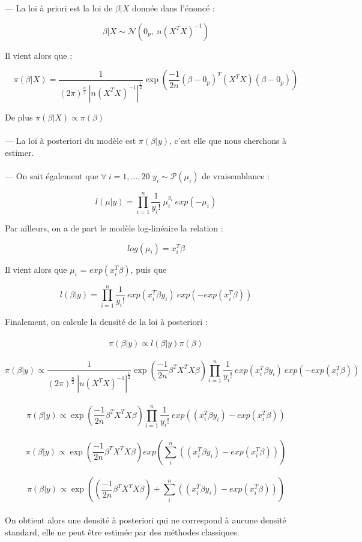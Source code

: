 \documentclass[french,12pt]{report}
\newcommand{\<}{\langle}
\renewcommand{\>}{\rangle}
\theoremstyle{definition}
\begin{document}
--- La loi à priori est la loi de  $\beta | X$ donnée dans l'énoncé   : 

$$ \beta | X \sim \mathcal{N}(0_p,\ n(X^TX)^{-1})  $$

\noindent Il vient alors que : 

$$\pi(\beta|X) =  \frac{1}{ (2\pi)^{\frac{n}{2}} \ |n(X^TX)^{-1} |^{\frac{1}{2}}} \exp(\frac{-1}{2n}(\beta-0_p)^T(X^TX)(\beta-0_p))$$ 


\noindent De plus $\pi(\beta|X) \propto \pi(\beta)$ \\
\\

--- La loi à posteriori du modèle est $\pi(\beta|y)$, c'est elle que nous cherchons à estimer. \\

\\

--- On sait également que $\forall \ i = 1,...,20$ $y_i \sim \mathcal{P}(\mu_i) $ de vraisemblance : 

$$l(\mu|y) = \prod_{i=1}^n \frac{1}{y_i ! } \ \mu_i^{y_i} \ exp(-\mu_i)$$

\noindent Par ailleurs, on a de part le modèle log-linéaire la relation : 

$$log(\mu_i)=x_i^T\beta$$

\noindent Il vient alors que $\mu_i$ = $exp(x_i^T \beta)$, puis que

$$l(\beta|y) = \prod_{i=1}^n \frac{1}{y_i ! } \ exp(x_i^T \beta y_i)\ exp(-exp(x_i^T\beta)) $$ 

\vspace{5mm}

\noindent Finalement, on calcule la densité de la loi à posteriori : \\
\\
$$\pi(\beta|y) \propto l(\beta|y)\pi(\beta)$$
\\
$$\pi(\beta|y) \propto \frac{1}{ (2\pi)^{\frac{n}{2}} \ |n(X^TX)^{-1} |^{\frac{1}{2}}} \exp(\frac{-1}{2n}\beta^TX^TX\beta) \prod_{i=1}^n \frac{1}{y_i ! } \ exp(x_i^T \beta y_i)\ exp(-exp(x_i^T\beta)) $$
\\


$$\pi(\beta|y) \propto  \exp(\frac{-1}{2n}\beta^TX^TX\beta) \prod_{i=1}^n \frac{1}{y_i ! } \ exp((x_i^T \beta y_i)-exp(x_i^T\beta)) $$
\\
$$\pi(\beta|y) \propto \exp(\frac{-1}{2n}\beta^TX^TX\beta)  exp(\sum_{i}^n((x_i^T \beta y_i)-exp(x_i^T\beta))) $$
\\
$$\pi(\beta|y) \propto \exp((\frac{-1}{2n}\beta^TX^TX\beta)  + \sum_{i}^n((x_i^T \beta y_i)-exp(x_i^T\beta))) $$
\vspace{5mm}
\\
On obtient alors une densité à posteriori qui ne correspond à aucune densité standard, elle ne peut être estimée par des méthodes classiques.
\end{document}
